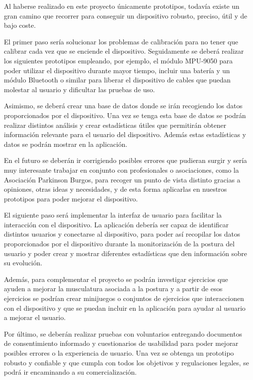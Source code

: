 

Al haberse realizado en este proyecto únicamente prototipos, todavía existe un gran camino que recorrer para conseguir un dispositivo robusto, preciso, útil y de bajo coste. 

El primer paso sería solucionar los problemas de calibración para no tener que calibrar cada vez que se enciende el dispositivo. Seguidamente se deberá realizar los siguientes prototipos empleando, por ejemplo, el módulo MPU-9050\cite{MPU9250_1,MPU9250_2} para poder utilizar el dispositivo durante mayor tiempo, incluir una batería y un módulo Bluetooth o similar para liberar el dispositivo de cables que puedan molestar al usuario y dificultar las pruebas de uso.

Asimismo, se deberá crear una base de datos donde se irán recogiendo los datos proporcionados por el dispositivo. Una vez se tenga esta base de datos se podrán realizar distintos análisis y crear estadísticas útiles que permitirán obtener información relevante para el usuario del dispositivo. Además estas estadísticas y datos se podrán mostrar en la aplicación.

En el futuro se deberán ir corrigiendo posibles errores que pudieran surgir y sería muy interesante trabajar en conjunto con profesionales o asociaciones, como la Asociación Parkinson Burgos\cite{ParkinsonBurgos}, para recoger un punto de vista distinto gracias a opiniones, otras ideas y necesidades, y de esta forma aplicarlas en nuestros prototipos para poder mejorar el dispositivo.

El siguiente paso será implementar la interfaz de usuario para facilitar la interacción con el dispositivo. La aplicación debería ser capaz de identificar distintos usuarios y conectarse al dispositivo, para poder así recopilar los datos proporcionados por el dispositivo durante la monitorización de la postura del usuario y poder crear y mostrar diferentes estadísticas que den información sobre su evolución. 

Además, para complementar el proyecto se podrán investigar ejercicios que ayuden a mejorar la musculatura asociada a la postura y a partir de esos ejercicios se podrían crear minijuegos o conjuntos de ejercicios que interaccionen con el dispositivo y que se puedan incluir en la aplicación para ayudar al usuario a mejorar el usuario.

Por último, se deberán realizar pruebas con voluntarios entregando documentos de consentimiento informado y cuestionarios de usabilidad para poder mejorar posibles errores o la experiencia de usuario. Una vez se obtenga un prototipo robusto y confiable y que cumpla con todos los objetivos y regulaciones legales, se podrá ir encaminando a su comercialización. 

